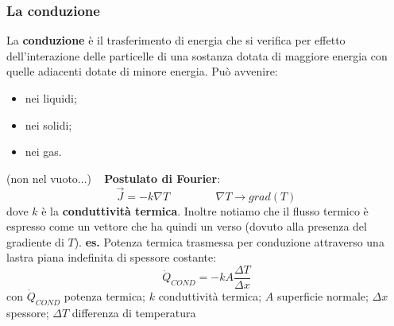 \subsubsection{La conduzione}
La \textbf{conduzione} è il trasferimento di energia che si verifica per effetto dell’interazione delle
particelle di una sostanza dotata di maggiore energia con quelle adiacenti dotate
di minore energia.\newline
\newline
Può avvenire:
\begin{itemize}
    \item nei liquidi;
    \item nei solidi;
    \item nei gas.
\end{itemize}
(non nel vuoto...)
\ \newline
\textbf{Postulato di Fourier}:
\[
    \vec{J} = - k \nabla T \;\;\;\;\;\;\;\;\;\;\;\;\;\;\; \nabla T \rightarrow grad(T)
\]
dove $k$ è la \textbf{conduttività termica}. Inoltre notiamo che il flusso termico è espresso come un vettore che ha quindi un verso (dovuto alla presenza del gradiente di $T$).\newline
\newline
\textbf{es.} Potenza termica trasmessa per conduzione attraverso una lastra piana indefinita di spessore costante:
\[
    \dot{Q}_{COND} =  - k A \frac{\Delta T}{\Delta x}
\]
con $\dot{Q}_{COND}$ potenza termica; $k$ conduttività termica; $A$ superficie normale; $\Delta x$ spessore; $\Delta T$ differenza di temperatura
